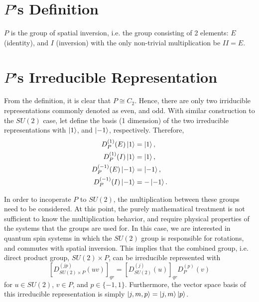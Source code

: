 \documentclass[12pt]{revtex4-2}
\begin{document}
\section{$P$'s Definition}
$P$ is the group of spatial inversion, i.e. the group consisting of 2 elements: $E$ (identity),
and $I$ (inversion) with the only non-trivial multiplication be $II=E$.

\section{$P$'s Irreducible Representation}
From the definition, it is clear that $P \cong C_2$. Hence, there are only two irriducible
representations commonly denoted as even, and odd. With similar construction to the $SU(2)$
case, let define the basis (1 dimension) of the two irreducible representations with
$\ket{1}$, and $\ket{-1}$, respectively. Therefore, 
\begin{equation}
    \begin{aligned}
        D_P^{(1)}(E)\ket{1} &= \ket{1}, \\
        D_P^{(1)}(I)\ket{1} &= \ket{1}, \\
        D_P^{(-1)}(E)\ket{-1} &= \ket{-1}, \\
        D_P^{(-1)}(I)\ket{-1} &=-\ket{-1}.
    \end{aligned}
\end{equation}

In order to incoperate $P$ to $SU(2)$, the multiplication between these groups need to
be considered. At this point, the purely mathematical treatment is not sufficient to
know the multiplication behavior, and require physical properties of the systems that
the groups are used for. In this case, we are interested in quantum spin systems in
which the $SU(2)$ group is responsible for rotations, and commutes with spatial inversion.
This implies that the combined group, i.e. direct product group, $SU(2)\times P$, can be
irreducible represented with
\begin{equation}
    \left[D_{SU(2)\times P}^{(jp)}(uv)\right]_{qr} = \left[D_{SU(2)}^{(j)}(u)\right]_{qr}D_P^{(p)}(v)
\end{equation}
for $u\in SU(2)$, $v\in P$, and $p\in \{-1, 1\}$. Furthermore, the vector space basis of this irreducible
representation is simply $\ket{j, m, p}=\ket{j, m}\ket{p}$.
\end{document}
